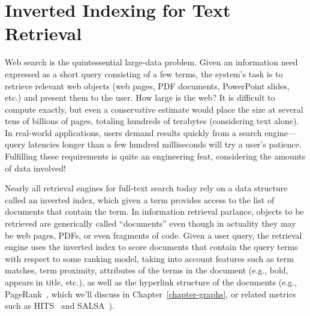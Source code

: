 \chapter{Inverted Indexing for Text Retrieval}
\label{chapter-indexing}

Web search is the quintessential large-data problem.  Given an
information need expressed as a short query consisting of a few terms,
the system's task is to retrieve relevant web objects (web pages, PDF
documents, PowerPoint slides, etc.) and present them to the user.  How
large is the web?  It is difficult to compute exactly, but even a
conservative estimate would place the size at several tens of billions
of pages, totaling hundreds of terabytes (considering text alone).  In
real-world applications, users demand results quickly from a search
engine---query latencies longer than a few hundred milliseconds will
try a user's patience.  Fulfilling these requirements is quite an
engineering feat, considering the amounts of data involved!

Nearly all retrieval engines for full-text search today rely on a data
structure called an inverted index, which given a term provides access
to the list of documents that contain the term.  In information
retrieval parlance, objects to be retrieved are generically called
``documents'' even though in actuality they may be web pages, PDFs, or
even fragments of code.  Given a user query, the retrieval engine uses
the inverted index to score documents that contain the query terms
with respect to some ranking model, taking into account features such
as term matches, term proximity, attributes of the terms in the
document (e.g., bold, appears in title, etc.), as well as the
hyperlink structure of the documents (e.g.,
PageRank~\cite{Page_etal_1999}, which we'll discuss in
Chapter~\ref{chapter-graphs}, or related metrics such as
HITS~\cite{Kleinberg_JACM1999} and
SALSA~\cite{Lempel_Moran_TOIS2001}).  


